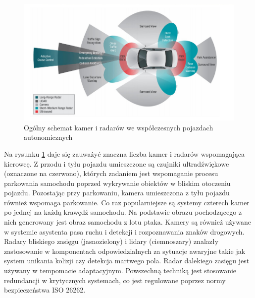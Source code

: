 \begin{figure}
  \centering
  \includegraphics[width=13cm]{img/systemy_autonomiczne_ogolnie.png}
  \caption{Ogólny schemat kamer i radarów we współczesnych pojazdach autonomicznych\cite{S1}}
  \label{fig:kamery_i_radary}
\end{figure}

Na rysunku \ref{fig:kamery_i_radary} daje się zauważyć znaczna liczba kamer i radarów wspomagająca kierowcę. Z przodu i tyłu pojazdu umieszczone są czujniki ultradźwiękowe (oznaczone na czerwono), których zadaniem jest wspomaganie procesu parkowania samochodu poprzed wykrywanie obiektów w bliskim otoczeniu pojazdu.
Pozostając przy parkowaniu, kamera umieszczona z tyłu pojazdu również wspomaga parkowanie. Co raz popularniejsze są systemy czterech kamer po jednej na każdą krawędź samochodu. Na podstawie obrazu pochodzącego z nich generowany jest obraz samochodu z lotu ptaka.
Kamery są również używane w systemie asystenta pasa ruchu i detekcji i rozpoznawania znaków drogowych.
Radary bliskiego zasięgu (jasnozielony) i lidary (ciemnoszary) znalazły zastosowanie w komponentach odpowiedzialnych za sytuacje awaryjne takie jak system unikania kolizji czy detekcja martwego pola.
Radar dalekiego zasięgu jest używany w tempomacie adaptacyjnym.
Powszechną techniką jest stosowanie redundancji w krytycznych systemach, co jest regulowane poprzez normy bezpieczeństwa ISO 26262.



